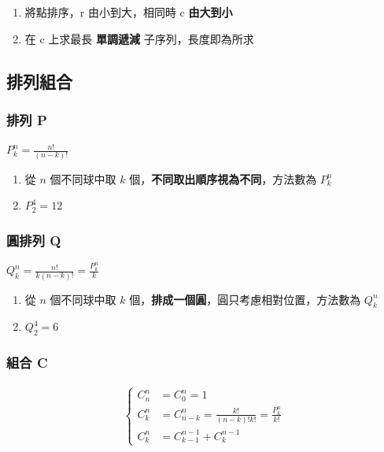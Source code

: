 \documentclass[10pt,oneside]{article}
\begin{document}
\begin{landscape}
\begin{multicols}{2}
{\begin{enumerate}
	\item 將點排序，r 由小到大，相同時 c \textbf{由大到小}
	\item 在 c 上求最長 \textbf{單調遞減} 子序列，長度即為所求
\end{enumerate}
}

\newpage
\subsection{排列組合}

\subsubsection{排列 P}

{\normalsize 
$P^n_k = \frac{n!}{(n-k)!}$

\begin{enumerate}
	\item 從 $n$ 個不同球中取 $k$ 個，\textbf{不同取出順序視為不同}，方法數為 $P^n_k$
	\item $P^4_2 = 12$
\end{enumerate}
}

\subsubsection{圓排列 Q}

{\normalsize
$Q^n_k = \frac{n!}{k (n-k)!} = \frac{P^n_k}{k}$

\begin{enumerate}
	\item 從 $n$ 個不同球中取 $k$ 個，\textbf{排成一個圓}，圓只考慮相對位置，方法數為 $Q^n_k$
	\item $Q^4_2 = 6$
\end{enumerate}
}

\subsubsection{組合 C}

{\normalsize
\begin{equation}
\begin{split}
\begin{cases}
	C^n_n &= C^n_0 = 1 \\
	C^n_k &= C^n_{n-k} = \frac{k!}{(n-k)!k!} = \frac{P^n_k}{k!} \\
	C^n_k &= C^{n-1}_{k-1} + C^{n-1}_{k}
\end{cases}
\end{split}
\end{equation}

}
\end{multicols}
\end{landscape}
\end{document}
